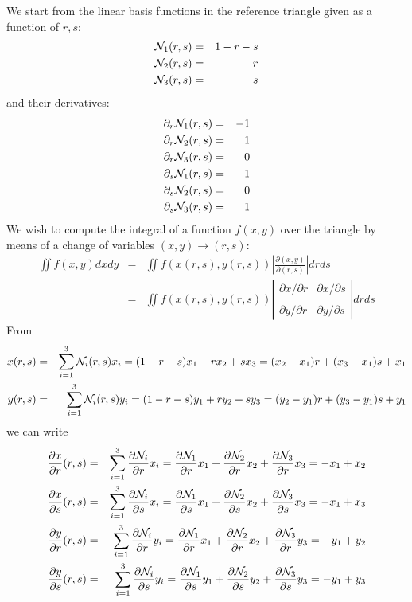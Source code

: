 We start from the linear basis functions in the reference triangle given as a function of $r,s$:
\begin{eqnarray}
{\mathcal{N}}_1(r,s) &=& 1-r-s \nonumber\\
{\mathcal{N}}_2(r,s) &=& r \nonumber\\
{\mathcal{N}}_3(r,s) &=& s \nonumber
\end{eqnarray}
and their derivatives:
\begin{eqnarray}
\partial_r {\mathcal{N}}_1(r,s) &=& -1 \nonumber\\
\partial_r {\mathcal{N}}_2(r,s) &=& 1 \nonumber\\
\partial_r {\mathcal{N}}_3(r,s) &=& 0 \nonumber\\
\partial_s {\mathcal{N}}_1(r,s) &=& -1 \nonumber\\
\partial_s {\mathcal{N}}_2(r,s) &=& 0\nonumber\\
\partial_s {\mathcal{N}}_3(r,s) &=& 1\nonumber
\end{eqnarray}
We wish to compute the integral of a function $f(x,y)$ over the triangle by means of a change of variables
$(x,y)\rightarrow (r,s)$:
\begin{eqnarray}
\iint f(x,y) dx dy 
&=& \iint f(x(r,s),y(r,s)) \left| \frac{\partial (x,y)}{\partial (r,s) } \right|  dr ds \nonumber\\
&=& \iint f(x(r,s),y(r,s)) 
\left| 
\begin{array}{cc}
\partial x/\partial r & \partial x/\partial s \\ \\
\partial y/\partial r & \partial y/\partial s 
\end{array}
\right|  dr ds 
\end{eqnarray}
From 
\begin{eqnarray}
x(r,s)&=&\sum_{i=1}^3 {\mathcal{N}}_i(r,s) x_i = (1-r-s)x_1 + rx_2 + sx_3 = (x_2-x_1)r+(x_3-x_1)s+x_1  \nonumber\\
y(r,s)&=&\sum_{i=1}^3 {\mathcal{N}}_i(r,s) y_i = (1-r-s)y_1 + ry_2 + sy_3 = (y_2-y_1)r+(y_3-y_1)s+y_1  \nonumber
\end{eqnarray}
we can write
\begin{eqnarray}
\frac{\partial x}{\partial r}(r,s)
&=&\sum_{i=1}^3 \frac{\partial {\mathcal{N}}_i}{\partial r} x_i
=\frac{\partial {\mathcal{N}}_1}{\partial r} x_1+\frac{\partial {\mathcal{N}}_2}{\partial r} x_2+\frac{\partial {\mathcal{N}}_3}{\partial r} x_3
=- x_1+ x_2 \nonumber\\
\frac{\partial x}{\partial s}(r,s)
&=&\sum_{i=1}^3 \frac{\partial {\mathcal{N}}_i}{\partial s} x_i
=\frac{\partial {\mathcal{N}}_1}{\partial s} x_1+\frac{\partial {\mathcal{N}}_2}{\partial s} x_2+\frac{\partial {\mathcal{N}}_3}{\partial s} x_3
=- x_1+ x_3
\nonumber\\
\frac{\partial y}{\partial r}(r,s)
&=&\sum_{i=1}^3 \frac{\partial {\mathcal{N}}_i}{\partial r} y_i
=\frac{\partial {\mathcal{N}}_1}{\partial r} x_1+\frac{\partial {\mathcal{N}}_2}{\partial r} x_2+\frac{\partial {\mathcal{N}}_3}{\partial r} y_3
=- y_1+ y_2
\nonumber\\
\frac{\partial y}{\partial s}(r,s)
&=&\sum_{i=1}^3 \frac{\partial {\mathcal{N}}_i}{\partial s} y_i
=\frac{\partial {\mathcal{N}}_1}{\partial s} y_1+\frac{\partial {\mathcal{N}}_2}{\partial s} y_2+\frac{\partial {\mathcal{N}}_3}{\partial s} y_3
=- y_1+ y_3
\end{eqnarray}
